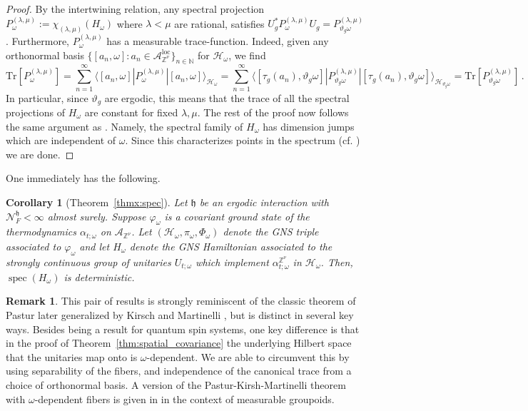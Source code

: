\documentclass{article}
\newcommand{\Tr}{\text{Tr}}
\newcommand{\calN}{\mathcal{N}^{\mathfrak{h}}_F}
\newcommand{\Znu}{\mathbb{Z}^\nu}
\newcommand{\A}{\mathcal{A}}
\newcommand{\N}{\mathbb N}
\DeclareMathOperator{\loc}{loc}
\newcommand{\aloc}{\mathcal{A}_{\mathbb{Z}^\nu}^{\loc}}
\newcommand{\<}{\langle}
\renewcommand{\>}{\rangle}
\DeclareMathOperator{\spec}{spec}
\newcommand{\h}{\mathfrak{h}}
\newtheorem{cor}[thm]{Corollary}
\theoremstyle{definition}
\newtheorem{rmk}[thm]{Remark}
\numberwithin{equation}{section}
\begin{document}
\begin{proof}
By the intertwining relation, any spectral projection $P^{(\lambda, \mu)}_\omega := \chi_{(\lambda, \mu)}(H_\omega)$ where $\lambda < \mu$ are rational, satisfies $U_g^*P^{(\lambda, \mu)}_\omega U_g= P^{(\lambda,\mu)}_{\vartheta_g \omega}$. Furthermore, $P^{(\lambda, \mu)}_\omega$ has a measurable trace-function. Indeed, given any orthonormal basis $\{[a_n, \omega]\colon a_n\in \aloc\}_{n\in \N}$ for $\mathcal{H}_\omega$, we find 
    \[
        \Tr[P^{(\lambda, \mu)}_\omega] = \sum_{n=1}^\infty \<[a_n,\omega]| P^{(\lambda,\mu)}_\omega |[a_n,\omega]\rangle_{\mathcal{H}_\omega} = \sum_{n=1}^\infty \< [\tau_g(a_n), \vartheta_g\omega]| P^{(\lambda, \mu)}_{\vartheta_g \omega} |[\tau_g(a_n), \vartheta_g\omega]\>_{\mathcal{H}_{\vartheta_g \omega}} = \Tr[P^{(\lambda,\mu)}_{\vartheta_g\omega}]\,.
    \]In particular, since $\vartheta_g$ are ergodic, this means that the trace of all the spectral projections of $H_\omega$ are constant for fixed $\lambda, \mu$. The rest of the proof now follows the same argument as \cite{KirschMartinelli}. Namely, the spectral family of $H_\omega$ has dimension jumps which are independent of $\omega$. Since this characterizes points in the spectrum (cf. \cite[Theorems 7.22 and 7.24]{Weidmann}) we are done. 
\end{proof}

One immediately has the following. 
\begin{cor}[Theorem~\ref{thmx:spec}]\label{thm:Bulk_gap_const}
    Let $\h$ be an ergodic interaction with $\calN<\infty$ almost surely. Suppose $\varphi_\omega$ is a covariant ground state of the thermodynamics $\alpha_{t;\omega}$ on $\A_{\Znu}$. Let $(\mathcal{H}_\omega, \pi_\omega, \Phi_\omega)$ denote the GNS triple associated to $\varphi_\omega$ and let $H_\omega$ denote the GNS Hamiltonian associated to the strongly continuous group of unitaries $U_{t;\omega}$ which implement $\alpha^{\Znu}_{t;\omega}$ in $\mathcal{H}_\omega$. Then, $\spec(H_\omega)$ is deterministic.
\end{cor}

\begin{rmk}
    This pair of results is strongly reminiscent of the classic theorem of Pastur \cite{Pastur75} later generalized by Kirsch and Martinelli \cite[Theorem 1]{KirschMartinelli}, but is distinct in several key ways. Besides being a result for quantum spin systems, one key difference is that in the proof of Theorem~\ref{thm:spatial_covariance} the underlying Hilbert space that the unitaries map onto is $\omega$-dependent. We are able to circumvent this by using separability of the fibers, and independence of the canonical trace from a choice of orthonormal basis. A version of the Pastur-Kirsh-Martinelli theorem with $\omega$-dependent fibers is given in \cite{Lentz_et_al} in the context of measurable groupoids. 
\end{rmk}
\end{document}
